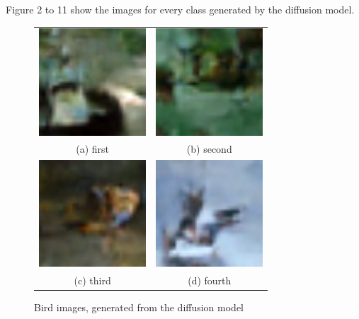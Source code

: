 \documentclass[conference]{IEEEtran}
\begin{document}
Figure 2 to 11 show the images for every class generated by the diffusion model.
\begin{figure}
  \begin{tabular}{cc}
    \includegraphics[width=40mm]{./images/generated-imgs/bird/0204.png} 
&   \includegraphics[width=40mm]{./images/generated-imgs/bird/0205.png} 
\\
  (a) first 
  & (b) second \\[6pt]
     \includegraphics[width=40mm]{./images/generated-imgs/bird/0206.png} 
  &  \includegraphics[width=40mm]{./images/generated-imgs/bird/0207.png} 
\\
  (c) third & (d) fourth \\[6pt]
  \end{tabular}
  \caption{Bird images, generated from the diffusion model}
  \end{figure}
\end{document}
